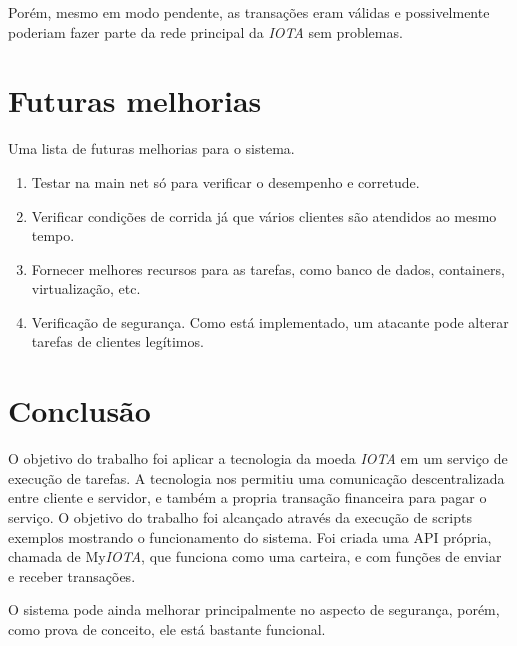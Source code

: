\documentclass[a4paper]{article}
\begin{document}
Porém, mesmo em modo pendente, as transações eram válidas e possivelmente poderiam fazer parte da rede principal da \textit{IOTA}
sem problemas.

\section{Futuras melhorias}\label{sec:Future}

Uma lista de futuras melhorias para o sistema.

\begin{enumerate}
\item Testar na main net só para verificar o desempenho e corretude.
\item Verificar condições de corrida já que vários clientes são atendidos ao mesmo tempo.
\item Fornecer melhores recursos para as tarefas, como banco de dados, containers, virtualização, etc.
\item Verificação de segurança. Como está implementado, um atacante pode alterar tarefas de clientes legítimos.
\end{enumerate}

\section{Conclusão}
O objetivo do trabalho foi aplicar a tecnologia da moeda \textit{IOTA} em um serviço de execução de tarefas. A tecnologia nos permitiu uma
comunicação descentralizada entre cliente e servidor, e também a propria transação financeira para pagar o serviço. O objetivo do
trabalho foi alcançado através da execução de scripts exemplos mostrando o funcionamento do sistema. Foi criada uma API própria,
chamada de My\textit{IOTA}, que funciona como uma carteira, e com funções de enviar e receber transações.

O sistema pode ainda melhorar principalmente no aspecto de segurança, porém, como prova de conceito, ele está bastante funcional.

%
%
\end{document}
